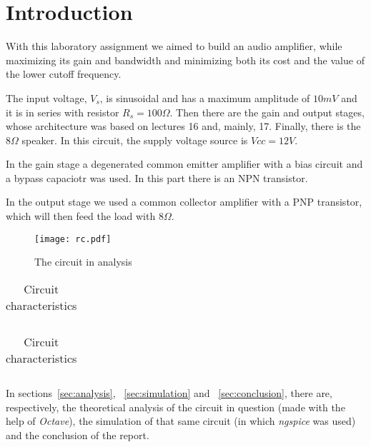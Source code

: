 \section{Introduction}
\label {sec:introduction}


With this laboratory assignment we aimed to build an audio amplifier, while maximizing its gain and bandwidth and minimizing both its cost and the value of the lower cutoff frequency.

The input voltage, $V_s$, is sinusoidal and has a maximum amplitude of $10 mV$ and it is in series with resistor $R_s=100 \Omega$. Then there are the gain and output stages, whose architecture was based on lectures 16 and, mainly, 17. Finally, there is the $8 \Omega$ speaker. In this circuit, the supply voltage source is $Vcc=12 V$.

In the gain stage a degenerated common emitter amplifier with a bias circuit and a bypass capaciotr was used. In this part there is an NPN transistor.

In the output stage we used a common collector amplifier with a PNP transistor, which will then feed the load with $8 \Omega$.



\begin{figure}[H] \centering
\texttt{[image: rc.pdf]}
\caption{The circuit in analysis}
\label{fig:circuit}
\end{figure}


\begin{table}[H]
  \centering
  \begin{tabular}{|c|c|}
    \hline
      
  \end{tabular}
  \caption{Circuit characteristics}
  \label{tab:resistance}
\end{table}

\begin{table}[H]
  \centering
  \begin{tabular}{|c|c|}
    \hline
      
  \end{tabular}
  \caption{Circuit characteristics}
  \label{tab:resistance1}
\end{table}

In sections~\ref{sec:analysis}, ~\ref{sec:simulation} and ~\ref{sec:conclusion}, there are, respectively, the theoretical analysis of the circuit in question (made with the help of \textit{Octave}), the simulation of that same circuit (in which \textit{ngspice} was used) and the conclusion of the report.
